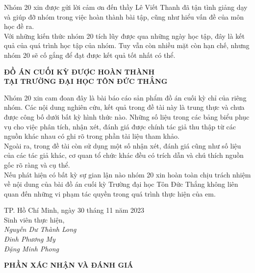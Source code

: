 \documentclass[13pt]{report}
\begin{document}
	Nhóm 20 xin được gửi lời cảm ơn đến thầy Lê Viết Thanh đã tận tình giảng dạy và giúp đỡ nhóm trong việc hoàn thành bài tập, cũng như hiểu vấn đề của môn học đề ra.\\
	Với những kiến thức nhóm 20 tích lũy được qua những ngày học tập, đây là kết quả của quá trình học tập của nhóm. Tuy vẫn còn nhiều mặt còn hạn chế, nhưng nhóm 20 sẽ cố gắng để đạt được kết quả tốt nhất có thể.\\
	\newpage
	\begin{center}
		\textbf{ĐỒ ÁN CUỐI KỲ ĐƯỢC HOÀN THÀNH} \\
		\textbf{TẠI TRƯỜNG ĐẠI HỌC TÔN ĐỨC THẮNG} \\
	\end{center}	
	Nhóm 20 xin cam đoan đây là bài báo cáo sản phẩm đồ án cuối kỳ chỉ của riêng nhóm. Các nội dung nghiên cứu, kết quả trong đề tài này là trung thực và chưa được công bố dưới bất kỳ hình thức nào. Những số liệu trong các bảng biểu phục vụ cho việc phân tích, nhận xét, đánh giá được chính tác giả thu thập từ các nguồn khác nhau có ghi rõ trong phần tài liệu tham khảo.\\
	Ngoài ra, trong đề tài còn sử dụng một số nhận xét, đánh giá cũng như số liệu của các tác giả khác, cơ quan tổ chức khác đều có trích dẫn và chú thích nguồn gốc rõ ràng và cụ thể.\\
	Nếu phát hiện có bất kỳ sự gian lận nào nhóm 20 xin hoàn toàn chịu trách nhiệm về nội dung của bài đồ án cuối kỳ  Trường đại học Tôn Đức Thắng không liên quan đến những vi phạm tác quyền trong quá trình thực hiện của em.\\
	\begin{center}
		\hspace*{5cm}TP. Hồ Chí Minh, ngày 30 tháng 11 năm 2023\\
		\hspace*{7cm}Sinh viên thực hiện,\\\vspace*{0.2cm}
		\hspace*{7cm}\textit{Nguyễn Dư Thành Long}\\
		\hspace*{7cm}\textit{Đinh Phương My}\\
		\hspace*{7cm}\textit{Đặng Minh Phong}\\
	\end{center}		
	\newpage
	\begin{center}
		\textbf{PHẦN XÁC NHẬN VÀ ĐÁNH GIÁ}
	\end{center}
\end{document}
